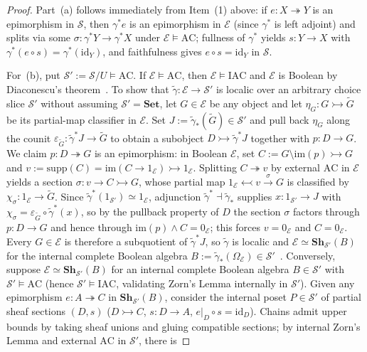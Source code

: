 \begin{proof}
Part~(a) follows immediately from Item~(1) above: if $e : X \twoheadrightarrow Y$ is an epimorphism in $\mathcal{S}$, then $\gamma^* e$ is an epimorphism in $\mathcal{E}$ (since $\gamma^*$ is left adjoint) and splits via some $\sigma : \gamma^* Y \to \gamma^* X$ under $\mathcal{E} \models \mathrm{AC}$; fullness of $\gamma^*$ yields $s : Y \to X$ with $\gamma^*(e \circ s) = \gamma^*(\mathrm{id}_Y)$, and faithfulness gives $e \circ s = \mathrm{id}_Y$ in $\mathcal{S}$.

For~(b), put $\mathcal{S}' := \mathcal{S}/U \models \mathrm{AC}$. If $\mathcal{E} \models \mathrm{AC}$, then $\mathcal{E} \models \mathrm{IAC}$ and $\mathcal{E}$ is Boolean by Diaconescu's theorem~\cite{Diaconescu75}. To show that $\tilde{\gamma} : \mathcal{E} \to \mathcal{S}'$ is localic over an arbitrary choice slice $\mathcal{S}'$ without assuming $\mathcal{S}' = \mathbf{Set}$, let $G \in \mathcal{E}$ be any object and let $\eta_G : G \rightarrowtail \widetilde{G}$ be its partial-map classifier in $\mathcal{E}$. Set $J := \tilde{\gamma}_*(\widetilde{G}) \in \mathcal{S}'$ and pull back $\eta_G$ along the counit $\varepsilon_{\widetilde{G}} : \tilde{\gamma}^* J \to \widetilde{G}$ to obtain a subobject $D \rightarrowtail \tilde{\gamma}^* J$ together with $p : D \to G$. We claim $p : D \twoheadrightarrow G$ is an epimorphism: in Boolean $\mathcal{E}$, set $C := G \setminus \mathrm{im}(p) \rightarrowtail G$ and $v := \mathrm{supp}(C) = \mathrm{im}(C \to 1_{\mathcal{E}}) \rightarrowtail 1_{\mathcal{E}}$. Splitting $C \twoheadrightarrow v$ by external $\mathrm{AC}$ in $\mathcal{E}$ yields a section $\sigma : v \to C \rightarrowtail G$, whose partial map $1_{\mathcal{E}} \leftarrowtail v \xrightarrow{\sigma} G$ is classified by $\chi_\sigma : 1_{\mathcal{E}} \to \widetilde{G}$. Since $\tilde{\gamma}^*(1_{\mathcal{S}'}) \simeq 1_{\mathcal{E}}$, adjunction $\tilde{\gamma}^* \dashv \tilde{\gamma}_*$ supplies $x : 1_{\mathcal{S}'} \to J$ with $\chi_\sigma = \varepsilon_{\widetilde{G}} \circ \tilde{\gamma}^*(x)$, so by the pullback property of $D$ the section $\sigma$ factors through $p : D \to G$ and hence through $\mathrm{im}(p) \wedge C = 0_{\mathcal{E}}$; this forces $v = 0_{\mathcal{E}}$ and $C = 0_{\mathcal{E}}$. Every $G \in \mathcal{E}$ is therefore a subquotient of $\tilde{\gamma}^* J$, so $\tilde{\gamma}$ is localic and $\mathcal{E} \simeq \mathbf{Sh}_{\mathcal{S}'}(B)$ for the internal complete Boolean algebra $B := \tilde{\gamma}_*(\Omega_{\mathcal{E}}) \in \mathcal{S}'$~\cite[\S A4.6, \S D4.5]{Johnstone02}. Conversely, suppose $\mathcal{E} \simeq \mathbf{Sh}_{\mathcal{S}'}(B)$ for an internal complete Boolean algebra $B \in \mathcal{S}'$ with $\mathcal{S}' \models \mathrm{AC}$ (hence $\mathcal{S}' \models \mathrm{IAC}$, validating Zorn's Lemma internally in $\mathcal{S}'$). Given any epimorphism $e : A \twoheadrightarrow C$ in $\mathbf{Sh}_{\mathcal{S}'}(B)$, consider the internal poset $P \in \mathcal{S}'$ of partial sheaf sections $(D, s)$ ($D \rightarrowtail C$, $s : D \to A$, $e|_D \circ s = \mathrm{id}_D$). Chains admit upper bounds by taking sheaf unions and gluing compatible sections; by internal Zorn's Lemma and external $\mathrm{AC}$ in $\mathcal{S}'$, there is 
\end{proof}
